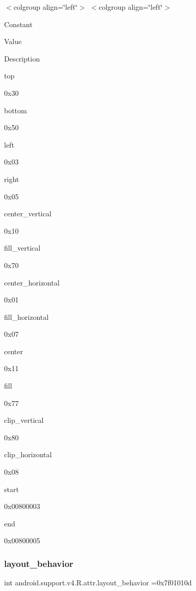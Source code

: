 \tabulinesep=1mm
\begin{longtabu} spread 0pt [c]{*{0}{|X[-1]}|}
\hline
\end{longtabu}
$<$colgroup align=\char`\"{}left\char`\"{}$>$ $<$colgroup align=\char`\"{}left\char`\"{}$>$ 

Constant

Value

Description 

{\ttfamily top}

0x30

{\ttfamily bottom}

0x50

{\ttfamily left}

0x03

{\ttfamily right}

0x05

{\ttfamily center\+\_\+vertical}

0x10

{\ttfamily fill\+\_\+vertical}

0x70

{\ttfamily center\+\_\+horizontal}

0x01

{\ttfamily fill\+\_\+horizontal}

0x07

{\ttfamily center}

0x11

{\ttfamily fill}

0x77

{\ttfamily clip\+\_\+vertical}

0x80

{\ttfamily clip\+\_\+horizontal}

0x08

{\ttfamily start}

0x00800003

{\ttfamily end}

0x00800005\mbox{\label{classandroid_1_1support_1_1v4_1_1R_1_1attr_ab0d50824521c62d51d34bec6a94acc92}} 
\subsubsection{\texorpdfstring{layout\+\_\+behavior}{layout\_behavior}}
{\footnotesize\ttfamily int android.\+support.\+v4.\+R.\+attr.\+layout\+\_\+behavior =0x7f01010d\hspace{0.3cm}{\ttfamily [static]}}

